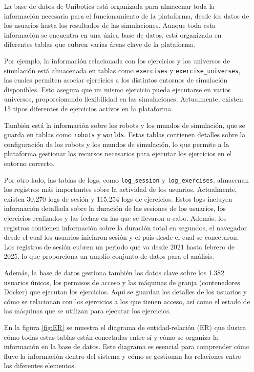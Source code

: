 \documentclass[a4paper, 12pt]{book}
\begin{document}
La base de datos de Unibotics está organizada para almacenar toda la información necesaria para el funcionamiento de la plataforma, desde los datos de los usuarios hasta los resultados de las simulaciones. Aunque toda esta información se encuentra en una única base de datos, está organizada en diferentes tablas que cubren varias áreas clave de la plataforma.

Por ejemplo, la información relacionada con los ejercicios y los universos de simulación está almacenada en tablas como \texttt{exercises} y \texttt{exercise\_universes}, las cuales permiten asociar ejercicios a los distintos entornos de simulación disponibles. Esto asegura que un mismo ejercicio pueda ejecutarse en varios universos, proporcionando flexibilidad en las simulaciones. Actualmente, existen 15 tipos diferentes de ejercicios activos en la plataforma.

También está la información sobre los robots y los mundos de simulación, que se guarda en tablas como \texttt{robots} y \texttt{worlds}. Estas tablas contienen detalles sobre la configuración de los robots y los mundos de simulación, lo que permite a la plataforma gestionar los recursos necesarios para ejecutar los ejercicios en el entorno correcto.

Por otro lado, las tablas de logs, como \texttt{log\_session} y \texttt{log\_exercises}, almacenan los registros más importantes sobre la actividad de los usuarios. Actualmente, existen 30.270 logs de sesión y 115.254 logs de ejercicios. Estos logs incluyen información detallada sobre la duración de las sesiones de los usuarios, los ejercicios realizados y las fechas en las que se llevaron a cabo. Además, los registros contienen información sobre la duración total en segundos, el navegador desde el cual los usuarios iniciaron sesión y el país desde el cual se conectaron. Los registros de sesión cubren un periodo que va desde 2021 hasta febrero de 2025, lo que proporciona un amplio conjunto de datos para el análisis.

Además, la base de datos gestiona también los datos clave sobre los 1.382 usuarios únicos, los permisos de acceso y las máquinas de granja (contenedores Docker) que ejecutan los ejercicios. Aquí se guardan los detalles de los usuarios y cómo se relacionan con los ejercicios a los que tienen acceso, así como el estado de las máquinas que se utilizan para ejecutar los ejercicios.

En la figura \ref{fig:ER} se muestra el diagrama de entidad-relación (ER) que ilustra cómo todas estas tablas están conectadas entre sí y cómo se organiza la información en la base de datos. Este diagrama es esencial para comprender cómo fluye la información dentro del sistema y cómo se gestionan las relaciones entre los diferentes elementos.
\end{document}
